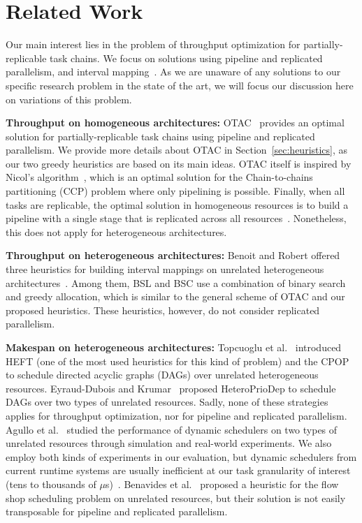 \section{Related Work}
\label{sec:rw}


Our main interest lies in the problem of throughput optimization for partially-replicable task chains.
We focus on solutions using pipeline and replicated parallelism, and interval mapping~\cite{benoit2013asurvey}.
As we are unaware of any solutions to our specific research problem in the state of the art, we will focus our discussion here on variations of this problem.

\textbf{Throughput on homogeneous architectures:}
OTAC~\cite{orhan2023} provides an optimal solution for partially-replicable task chains using pipeline and replicated parallelism.
We provide more details about OTAC in Section~\ref{sec:heuristics}, as our two greedy heuristics are based on its main ideas.
OTAC itself is inspired by Nicol’s algorithm~\cite{nicol1994rectilinear,pinar2004fast}, which is an optimal solution for the Chain-to-chains partitioning (CCP) problem where only pipelining is possible.
Finally, when all tasks are replicable, the optimal solution in homogeneous resources is to build a pipeline with a single stage that is replicated across all resources~\cite{benoit2010complexity}.
Nonetheless, this does not apply for heterogeneous architectures.

\textbf{Throughput on heterogeneous architectures:}
Benoit and Robert offered three heuristics for building interval mappings on unrelated heterogeneous architectures~\cite{benoit2008}.
Among them, BSL and BSC use a combination of binary search and greedy allocation, which is similar to the general scheme of OTAC and our proposed heuristics.
These heuristics, however, do not consider replicated parallelism.

\textbf{Makespan on heterogeneous architectures:} 
Topcuoglu et al.~\cite{topcuoglu99} introduced HEFT (one of the most used heuristics for this kind of problem) and the CPOP to schedule directed acyclic graphs (DAGs) over unrelated heterogeneous resources.
Eyraud-Dubois and Krumar~\cite{dubois2020} proposed HeteroPrioDep to schedule DAGs over two types of unrelated resources. %
Sadly, none of these strategies applies for throughput optimization, nor for pipeline and replicated parallelism.
Agullo et al.~\cite{agullo2015} studied the performance of dynamic schedulers on two types of unrelated resources through simulation and real-world experiments.
We also employ both kinds of experiments in our evaluation, but dynamic schedulers from current runtime systems are usually inefficient at our task granularity of interest (tens to thousands of $\mu$s)~\cite{slaughter2020}.
Benavides et al.~\cite{benavides2014} proposed a heuristic for the flow shop scheduling problem on unrelated resources, but their solution is not easily transposable for pipeline and replicated parallelism.

